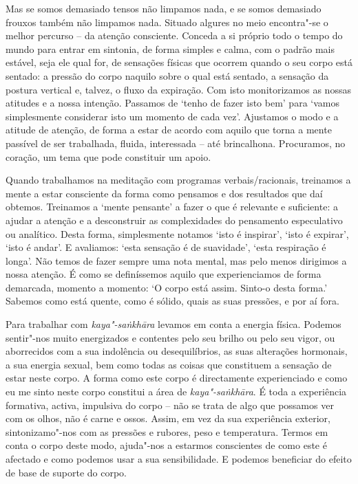 Mas se somos demasiado tensos não limpamos nada, e se somos demasiado frouxos
também não limpamos nada. Situado algures no meio encontra"-se o melhor percurso
-- da atenção consciente. Conceda a si próprio todo o tempo do mundo para entrar
em sintonia, de forma simples e calma, com o padrão mais estável, seja ele qual
for, de sensações físicas que ocorrem quando o seu corpo está sentado: a pressão
do corpo naquilo sobre o qual está sentado, a sensação da postura vertical e,
talvez, o fluxo da expiração. Com isto monitorizamos as nossas atitudes e a
nossa intenção. Passamos de `tenho de fazer isto bem' para `vamos simplesmente
considerar isto um momento de cada vez'. Ajustamos o modo e a atitude de
atenção, de forma a estar de acordo com aquilo que torna a mente passível de ser
trabalhada, fluida, interessada -- até brincalhona. Procuramos, no coração, um
tema que pode constituir um apoio.

Quando trabalhamos na meditação com programas verbais/racionais, treinamos a
mente a estar consciente da forma como pensamos e dos resultados que daí
obtemos. Treinamos a `mente pensante' a fazer o que é relevante e suficiente: a
ajudar a atenção e a desconstruir as complexidades do pensamento especulativo ou
analítico. Desta forma, simplesmente notamos `isto é inspirar', `isto é
expirar', `isto é andar'. E avaliamos: `esta sensação é de suavidade', `esta
respiração é longa'. Não temos de fazer sempre uma nota mental, mas pelo menos
dirigimos a nossa atenção. É como se definíssemos aquilo que experienciamos de
forma demarcada, momento a momento: `O corpo está assim. Sinto-o desta forma.'
Sabemos como está quente, como é sólido, quais as suas pressões, e por aí fora.

Para trabalhar com \emph{kaya"-saṅkhāra} levamos em conta a energia física.
Podemos sentir"-nos muito energizados e contentes pelo seu brilho ou pelo seu
vigor, ou aborrecidos com a sua indolência ou desequilíbrios, as suas alterações
hormonais, a sua energia sexual, bem como todas as coisas que constituem a
sensação de estar neste corpo. A forma como este corpo é directamente
experienciado e como eu me sinto neste corpo constitui a área de
\emph{kaya"-saṅkhāra}. É toda a experiência formativa, activa, impulsiva do corpo
-- não se trata de algo que possamos ver com os olhos, não é carne e ossos.
Assim, em vez da sua experiência exterior, sintonizamo"-nos com as pressões e
rubores, peso e temperatura. Termos em conta o corpo deste modo, ajuda"-nos a
estarmos conscientes de como este é afectado e como podemos usar a sua
sensibilidade. E podemos beneficiar do efeito de base de suporte do corpo.

